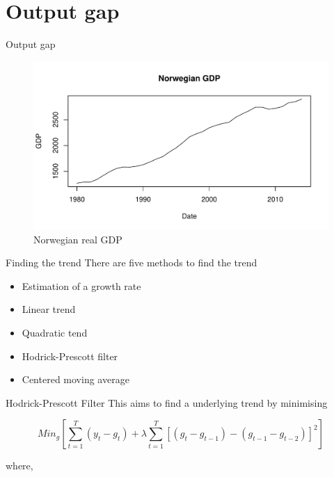 \documentclass[14pt,xcolor=pdftex,dvipsnames,table]{beamer}\usepackage[]{graphicx}\usepackage[]{color}
\makeatletter
\def\maxwidth{ %
  \ifdim\Gin@nat@width>\linewidth
    \linewidth
  \else
    \Gin@nat@width
  \fi
}
\newenvironment{knitrout}{}{} %
\makeatother
\begin{document}
\section{Output gap}
\begin{frame}{Output gap}
\begin{knitrout}
\color{fgcolor}\begin{figure}
\includegraphics[width=\maxwidth]{figure/GDP-1} \caption[Norwegian real GDP]{Norwegian real GDP\label{fig:GDP}}
\end{figure}


\end{knitrout}
\end{frame}

\begin{frame}{Finding the trend}
There are five methods to find the trend
\pause
\begin{itemize}[<+-| alert@+>]
\item Estimation of a growth rate 
\item Linear trend
\item Quadratic tend
\item Hodrick-Prescott filter
\item Centered moving average
\end{itemize}
\end{frame}

\begin{frame}{Hodrick-Prescott Filter}
This aims to find a underlying trend by minimising 
\begin{block}{}
\begin{equation*}
Min_g \left [\sum_{t=1}^T (y_t - g_t) + \lambda \sum_{t=1}^T [(g_t - g_{t-1}) - (g_{t-1}-g_{t-2})]^2 \right ]
\end{equation*}
\end{block}
where, 
\end{frame}
\end{document}
